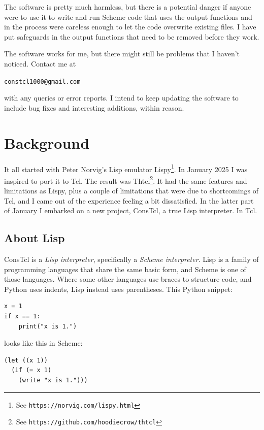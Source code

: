 \documentclass[twoside]{report}
\begin{document}
The software is pretty much harmless, but there is a potential danger if anyone
were to use it to write and run Scheme code that uses the output functions and
in the process were careless enough to let the code overwrite existing files. I
have put safeguards in the output functions that need to be removed before they
work.

The software works for me, but there might still be problems that I haven't
noticed. Contact me at

\indent \texttt{constcl1000@gmail.com}

with any queries or error reports. I intend to keep updating the software to
include bug fixes and interesting additions, within reason.

\section{Background}
\label{background}

It all started with Peter Norvig's Lisp emulator
Lispy\footnote{See \texttt{https://norvig.com/lispy.html}}. In January 2025 I
was inspired to port it to Tcl. The result was Thtcl\footnote{See
\texttt{https://github.com/hoodiecrow/thtcl}}. It had the same features and
limitations as Lispy, plus a couple of limitations that were due to
shortcomings of Tcl, and I came out of the experience feeling a bit
dissatisfied. In the latter part of January I embarked on a new project,
ConsTcl, a true Lisp interpreter. In Tcl.

\subsection{About Lisp}
\label{about-lisp}

ConsTcl is a \emph{Lisp interpreter}, specifically a \emph{Scheme interpreter}.
Lisp is a family of programming languages that share the same basic form, and
Scheme is one of those languages. Where some other languages use braces to
structure code, and Python uses indents, Lisp instead uses parentheses. This
Python snippet:

\begin{verbatim}
x = 1
if x == 1:
    print("x is 1.")
\end{verbatim}

\noindent looks like this in Scheme:

\begin{verbatim}
(let ((x 1))
  (if (= x 1)
    (write "x is 1.")))
\end{verbatim}
\end{document}
